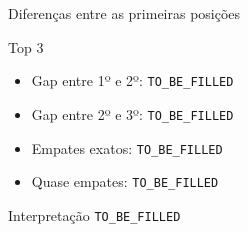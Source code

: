 %
%



\begin{frame}{Diferenças entre as primeiras posições}

    \begin{block}{Top 3}
        \begin{itemize}
            \item Gap entre 1º e 2º:
                  \texttt{TO\_BE\_FILLED}

            \item Gap entre 2º e 3º:
                  \texttt{TO\_BE\_FILLED}

            \item Empates exatos:
                  \texttt{TO\_BE\_FILLED}

            \item Quase empates:
                  \texttt{TO\_BE\_FILLED}
        \end{itemize}
    \end{block}

    \vspace{0.3cm}

    \begin{block}{Interpretação}
        \texttt{TO\_BE\_FILLED}
    \end{block}

\end{frame}



